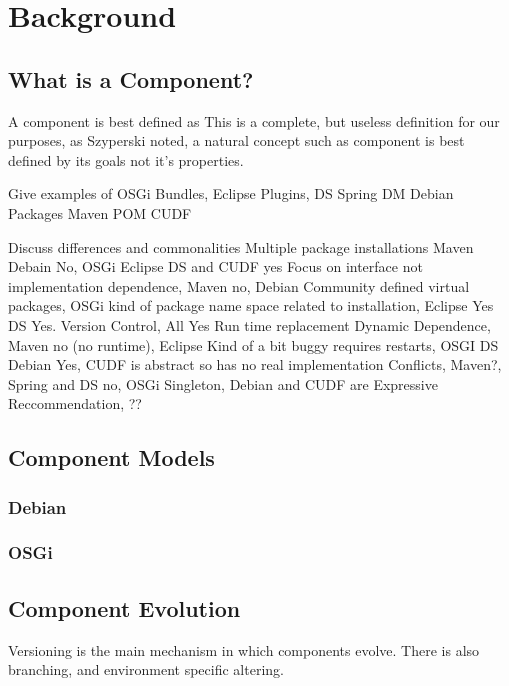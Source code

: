 \chapter{Background}

\section{What is a Component?}

A component is best defined as
This is a complete, but useless definition for our purposes, 
as Szyperski noted, a natural concept such as component is best defined by its goals not it's properties. %


Give examples of OSGi Bundles, Eclipse Plugins, DS
Spring DM
Debian Packages
Maven POM
CUDF

Discuss differences and commonalities
Multiple package installations Maven Debain No, OSGi Eclipse DS and CUDF yes
Focus on interface not implementation dependence, Maven no, Debian Community defined virtual packages, 
OSGi kind of package name space related to installation, Eclipse Yes DS Yes.
Version Control, All Yes
Run time replacement Dynamic Dependence, Maven no (no runtime), Eclipse Kind of a bit buggy requires restarts,
OSGI DS Debian Yes, CUDF is abstract so has no real implementation
Conflicts, Maven?, Spring and DS no,  OSGi Singleton, Debian and CUDF are Expressive
Reccommendation, ??

\section{Component Models}

\subsection{Debian}

\subsection{OSGi}

\section{Component Evolution}
Versioning is the main mechanism in which components evolve.
There is also branching, and environment specific altering.

